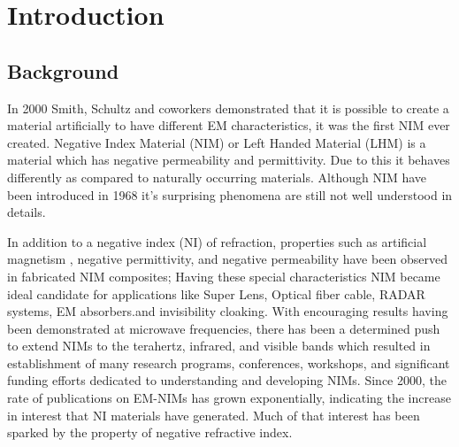 
\chapter{Introduction} %

\label{Chapter1} %

\fancyhead[RO]{\thepage}
\fancyhead[RE]{\thepage}
\fancyhead[LO]{\emph{\ttitle}}


\section{Background }

In 2000 Smith, Schultz and coworkers \citep{smith} demonstrated that it is possible to create a material artificially to have different EM  characteristics, it was the first NIM ever created. Negative Index Material (NIM) or Left Handed Material (LHM) is a material which has negative permeability and permittivity. Due to this it behaves differently as compared to naturally occurring materials. Although NIM have been introduced in 1968 %
it's surprising phenomena are still not well understood in details.

 In addition
to a negative index (NI) of refraction, properties such as artificial
magnetism %
, negative permittivity, and negative permeability have
been observed in fabricated NIM composites; 
Having these special characteristics NIM became ideal candidate 
for applications like Super Lens, Optical fiber cable, RADAR systems, EM absorbers.and invisibility cloaking. With
encouraging results having been demonstrated at microwave
frequencies, there has been a determined push to extend NIMs to
the terahertz, infrared, and visible bands which resulted in establishment of many
research programs, conferences, workshops, and significant
funding efforts dedicated to understanding and developing NIMs.
Since 2000, the rate of publications on EM-NIMs has grown
exponentially, %
indicating the increase in interest that NI
materials have generated. Much of that interest has been sparked by
the property of negative refractive index.

